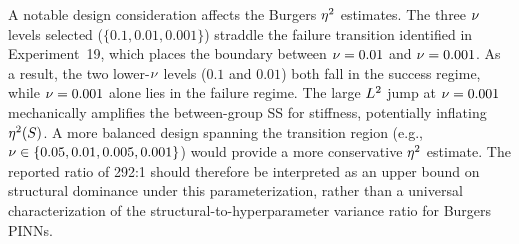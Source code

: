 A notable design consideration affects the Burgers $\eta^2$ estimates. The three $\nu$ levels selected ($\{0.1, 0.01, 0.001\}$) straddle the failure transition identified in Experiment~19, which places the boundary between $\nu=0.01$ and $\nu=0.001$. As a result, the two lower-$\nu$ levels ($0.1$ and $0.01$) both fall in the success regime, while $\nu=0.001$ alone lies in the failure regime. The large $L^2$ jump at $\nu=0.001$ mechanically amplifies the between-group SS for stiffness, potentially inflating $\eta^2{}(S)$. A more balanced design spanning the transition region (e.g., $\nu \in \{0.05, 0.01, 0.005, 0.001\}$) would provide a more conservative $\eta^2$ estimate. The reported ratio of 292:1 should therefore be interpreted as an upper bound on structural dominance under this parameterization, rather than a universal characterization of the structural-to-hyperparameter variance ratio for Burgers PINNs.

